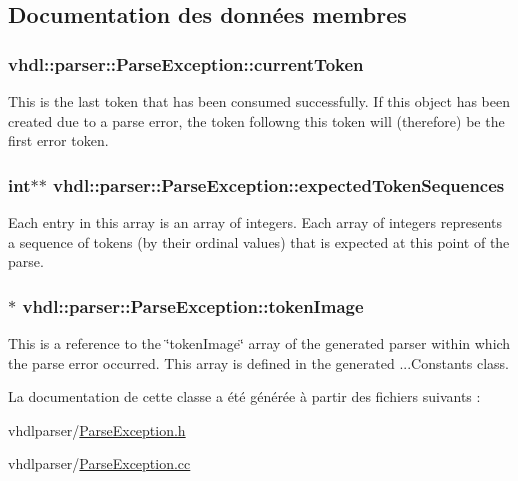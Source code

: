 \subsection{Documentation des données membres}
\hypertarget{classvhdl_1_1parser_1_1_parse_exception_aadd2253ddf7f1c87444d51fc22efd9fe}{}
\subsubsection[{current\+Token}]{ vhdl\+::parser\+::\+Parse\+Exception\+::current\+Token}\label{classvhdl_1_1parser_1_1_parse_exception_aadd2253ddf7f1c87444d51fc22efd9fe}
This is the last token that has been consumed successfully. If this object has been created due to a parse error, the token followng this token will (therefore) be the first error token. \hypertarget{classvhdl_1_1parser_1_1_parse_exception_a28848a83d7553352654dd5ccb7ed40ef}{}
\subsubsection[{expected\+Token\+Sequences}]{\setlength{\rightskip}{0pt plus 5cm}int$\ast$$\ast$ vhdl\+::parser\+::\+Parse\+Exception\+::expected\+Token\+Sequences}\label{classvhdl_1_1parser_1_1_parse_exception_a28848a83d7553352654dd5ccb7ed40ef}
Each entry in this array is an array of integers. Each array of integers represents a sequence of tokens (by their ordinal values) that is expected at this point of the parse. \hypertarget{classvhdl_1_1parser_1_1_parse_exception_a59256facf9b653896026ab05f0eb4728}{}
\subsubsection[{token\+Image}]{$\ast$ vhdl\+::parser\+::\+Parse\+Exception\+::token\+Image}\label{classvhdl_1_1parser_1_1_parse_exception_a59256facf9b653896026ab05f0eb4728}
This is a reference to the \char`\"{}token\+Image\char`\"{} array of the generated parser within which the parse error occurred. This array is defined in the generated ...Constants class. 

La documentation de cette classe a été générée à partir des fichiers suivants \+:\begin{DoxyCompactItemize}
\item 
vhdlparser/\hyperlink{_parse_exception_8h}{Parse\+Exception.\+h}\item 
vhdlparser/\hyperlink{_parse_exception_8cc}{Parse\+Exception.\+cc}\end{DoxyCompactItemize}
